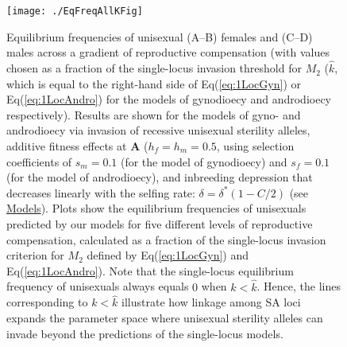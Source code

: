 \documentclass{article}
\begin{document}
\begin{figure}[htbp]
\centering
\texttt{[image: ./EqFreqAllKFig]}
\caption{Equilibrium frequencies of unisexual (A--B) females and (C--D) males across a gradient of reproductive compensation (with values chosen as a fraction of the single-locus invasion threshold for $M_2$ ($\hat{k}$, which is equal to the right-hand side of Eq(\ref{eq:1LocGyn}) or Eq(\ref{eq:1LocAndro}) for the models of gynodioecy and androdioecy respectively). Results are shown for the models of gyno- and androdioecy via invasion of recessive unisexual sterility alleles, additive fitness effects at $\mathbf{A}$ ($h_f = h_m = 0.5$, using selection coefficients of $s_m = 0.1$ (for the model of gynodioecy) and $s_f = 0.1$ (for the model of androdioecy), and inbreeding depression that decreases linearly with the selfing rate: $\delta = \delta^\ast(1 - C/2)$ (see \hyperref[sec:Models]{Models}). Plots show the equilibrium frequencies of unisexuals predicted by our models for five different levels of reproductive compensation, calculated as a fraction of the single-locus invasion criterion for $M_2$ defined by Eq(\ref{eq:1LocGyn}) and Eq(\ref{eq:1LocAndro}). Note that the single-locus equilibrium frequency of unisexuals always equals $0$ when $k < \hat{k}$. Hence, the lines corresponding to $k < \hat{k}$ illustrate how linkage among SA loci expands the parameter space where unisexual sterility alleles can invade beyond the predictions of the single-locus models.}
\label{fig:eqFreq}
\end{figure}
\end{document}
